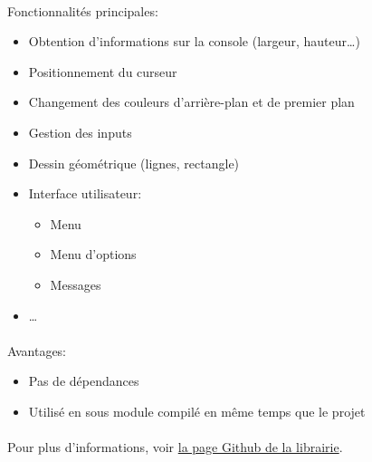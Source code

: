 \documentclass[article, backcover, french, nodocumentinfo]{upmethodology-document}
\begin{document}
				\paragraph*{}
					Fonctionnalités principales:
					\begin{itemize}
						\item Obtention d'informations sur la console (largeur, hauteur\ldots)
						\item Positionnement du curseur
						\item Changement des couleurs d'arrière-plan et de premier plan
						\item Gestion des inputs
						\item Dessin géométrique (lignes, rectangle)
						\item Interface utilisateur:
							\begin{itemize}
								\item Menu
								\item Menu d'options
								\item Messages
							\end{itemize}
						\item \ldots
					\end{itemize}
				\paragraph*{}
					Avantages:
					\begin{itemize}
						\item Pas de dépendances
						\item Utilisé en sous module compilé en même temps que le projet
					\end{itemize}
				\paragraph*{}
					Pour plus d'informations, voir \href{https://github.com/pinam45/ConsoleControl}{la page Github de la librairie}.
\end{document}
